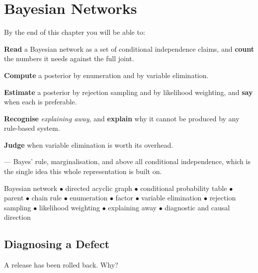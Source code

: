 \chapter{Bayesian Networks}\label{ch:bayesnets}

\begin{outcomes}
By the end of this chapter you will be able to:
\begin{tight}
  \item \textbf{Read} a Bayesian network as a set of conditional independence
        claims, and \textbf{count} the numbers it needs against the full joint.
  \item \textbf{Compute} a posterior by enumeration and by variable elimination.
  \item \textbf{Estimate} a posterior by rejection sampling and by likelihood
        weighting, and \textbf{say} when each is preferable.
  \item \textbf{Recognise} \emph{explaining away}, and \textbf{explain} why it
        cannot be produced by any rule-based system.
  \item \textbf{Judge} when variable elimination is worth its overhead.
\end{tight}
\end{outcomes}

\begin{prereq}
 --- Bayes' rule, marginalisation, and above all conditional
independence, which is the single idea this whole representation is built on.
\end{prereq}

\begin{keyterms}
Bayesian network $\bullet$ directed acyclic graph $\bullet$ conditional probability
table $\bullet$ parent $\bullet$ chain rule $\bullet$ enumeration $\bullet$ factor
$\bullet$ variable elimination $\bullet$ rejection sampling $\bullet$ likelihood
weighting $\bullet$ explaining away $\bullet$ diagnostic and causal direction
\end{keyterms}

\section{Diagnosing a Defect}

A release has been rolled back. Why?

